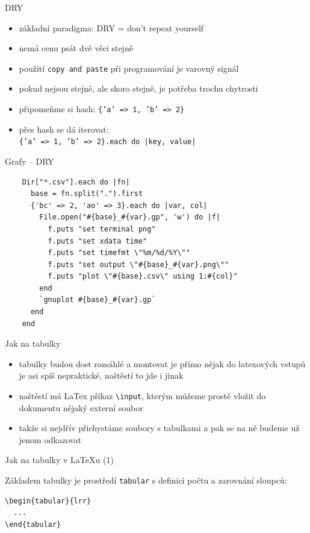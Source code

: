 \documentclass{beamer}
\begin{document}
\begin{frame}[fragile]{DRY}
  \begin{itemize}
    \item základní paradigma: DRY = don't repeat yourself
    \item nemá cenu psát dvě věci stejně
    \item použití \texttt{copy and paste} při programování je varovný signál
    \item pokud nejsou stejně, ale skoro stejně, je potřeba trochu chytrosti
    \item připomeňme si hash: \texttt{\{'a' => 1, 'b' => 2\}}
    \item přes hash se dá iterovat: \\ \texttt{\{'a' => 1, 'b' => 2\}.each do |key, value|}
  \end{itemize}
\end{frame}

\begin{frame}[fragile]{Grafy -- DRY}
  \tiny
  \begin{verbatim}
    Dir["*.csv"].each do |fn|
      base = fn.split(".").first
      {'bc' => 2, 'ao' => 3}.each do |var, col|
        File.open("#{base}_#{var}.gp", 'w') do |f|
          f.puts "set terminal png"
          f.puts "set xdata time"
          f.puts "set timefmt \"%m/%d/%Y\""
          f.puts "set output \"#{base}_#{var}.png\""
          f.puts "plot \"#{base}.csv\" using 1:#{col}"
        end
        `gnuplot #{base}_#{var}.gp`
      end
    end
  \end{verbatim}
\end{frame}

\begin{frame}[fragile]{Jak na tabulky}
  \begin{itemize}
    \item tabulky budou dost rozsáhlé a montovat je přímo nějak do latexových vstupů je asi spíš nepraktické, naštěstí to jde i jinak
    \item naštěstí má LaTex příkaz \texttt{\textbackslash{}input}, kterým můžeme prostě vložit do dokumentu nějaký externí soubor
    \item takže si nejdřív přichystáme soubory s tabulkami a pak se na ně budeme už jenom odkazovat
  \end{itemize}
\end{frame}

\begin{frame}[fragile]{Jak na tabulky v LaTeXu (1)}
  \begin{block}{ }
    Základem tabulky je prostředí \texttt{tabular} s definicí počtu a zarovnání sloupců:
    \scriptsize
    \begin{verbatim}
\begin{tabular}{lrr}
  ...
\end{tabular}
    \end{verbatim}
  \end{block}
\end{frame}
\end{document}

